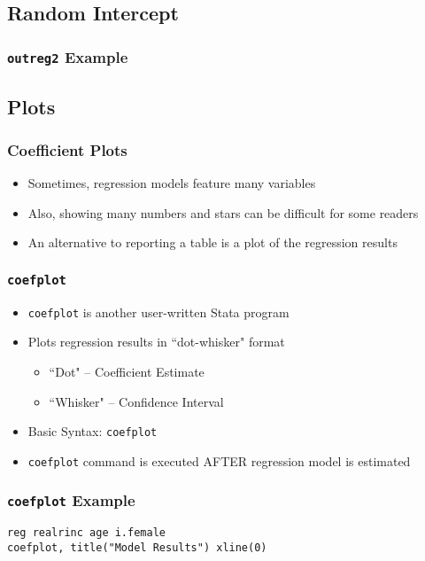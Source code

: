 \documentclass{beamer}
\begin{document}
\subsection{Random Intercept}

\begin{frame}
	\frametitle{\texttt{outreg2} Example}
\end{frame}

\subsection{Plots}

\begin{frame}
	\frametitle{Coefficient Plots}
		\begin{itemize}
			\item Sometimes, regression models feature many variables
			\item Also, showing many numbers and stars can be difficult for some readers
			\item An alternative to reporting a table is a plot of the regression results
		\end{itemize}
\end{frame}

\begin{frame}
	\frametitle{\texttt{coefplot}}
		\begin{itemize}
			\item \texttt{coefplot} is another user-written Stata program
			\item Plots regression results in ``dot-whisker" format
				\begin{itemize}
					\item ``Dot" -- Coefficient Estimate
					\item ``Whisker" -- Confidence Interval
				\end{itemize}
			\item Basic Syntax: \texttt{coefplot}
			\item \texttt{coefplot} command is executed AFTER regression model is estimated
		\end{itemize}
\end{frame}

\begin{frame}
	\frametitle{\texttt{coefplot} Example}
		\texttt{reg realrinc age i.female}\\
		\texttt{coefplot, title("Model Results") xline(0)}
\end{frame}
\end{document}
